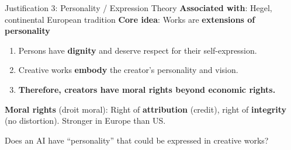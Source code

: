 ﻿\documentclass[aspectratio=169,11pt]{beamer}
\begin{document}
\begin{frame}{Justification 3: Personality / Expression Theory}
\textbf{Associated with}: Hegel, continental European tradition \hfill \textbf{Core idea}: Works are \textbf{extensions of personality}

\vspace{0.1cm}
\begin{argumentbox}
\begin{enumerate}
    \item Persons have \textbf{dignity} and deserve respect for their self-expression.
    \item Creative works \textbf{embody} the creator's personality and vision.
    \item[\textbf{C.}] \textbf{Therefore, creators have moral rights beyond economic rights.}
\end{enumerate}
\end{argumentbox}

\vspace{0.1cm}
\textbf{Moral rights} (droit moral): Right of \textbf{attribution} (credit), right of \textbf{integrity} (no distortion). Stronger in Europe than US.

\begin{discussionbox}[Discussion]
Does an AI have ``personality'' that could be expressed in creative works?
\end{discussionbox}
\end{frame}
\end{document}
